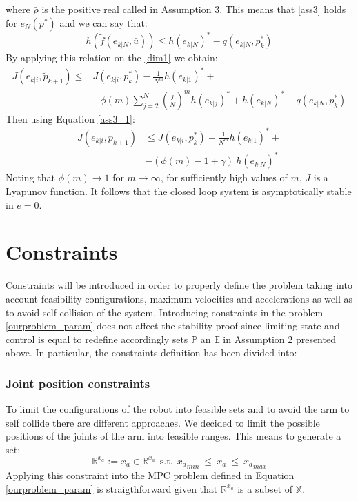 where $\bar{\rho}$ is the positive real called in Assumption 3.
This means that \ref{ass3} holds for $e_N(p^*)$ and we can say that:
\begin{equation*}
    h(\tilde{f}(e_{k|N},\bar{u})) \le h(e_{k|N})^*-q(e_{k|N},p_k^*)
\end{equation*}
By applying this relation on the \ref{dim1} we obtain: 
\begin{equation*}
    \begin{split}
        J({e}_{k|i},\tilde{p}_{k+1})\le &J({e}_{k|i},p_{k}^*) - \frac{1}{N^m}h(e_{k|1})^*+ \\ 
        &-\phi(m)\sum_{j=2}^{N}\left(\frac{j}{N}\right)^m h(e_{k|j})^*+ h(e_{k|N})^*-q(e_{k|N},p_k^*)
    \end{split}
\end{equation*}
Then using Equation \ref{ass3_1}:
\begin{equation*}
    \begin{split}
        J({e}_{k|i},\tilde{p}_{k+1})&\le J({e}_{k|i},p_{k}^*) - \frac{1}{N^m}h(e_{k|1})^*+ \\ 
            &-(\phi(m)-1+\gamma)\ h(e_{k|N})^*
    \end{split}
\end{equation*}
Noting that $\phi(m) \rightarrow 1$ for $m \rightarrow \infty$, for sufficiently high values of $m$, $J$ is a Lyapunov function. It follows that the closed loop system is asymptotically stable in $e=0$.

\section{Constraints}

Constraints will be introduced in order to properly define the problem taking into account feasibility configurations, maximum velocities and accelerations as well as to avoid self-collision of the system. Introducing constraints in the problem \ref{ourproblem_param} does not affect the stability proof since limiting state and control is equal to redefine accordingly sets $\mathbb{P}$ an $\mathbb{E}$ in Assumption 2 presented above.
In particular, the constraints definition has been divided into: 

\subsubsection*{Joint position constraints}
	To limit the configurations of the robot into feasible sets and to avoid the arm to self collide there are different approaches. We decided to limit the possible positions of the joints of the arm into feasible ranges. This means to generate a set:
	\begin{equation}
		\mathbb{R}^{x_a}:=x_a \in \mathbb{R}^{x_a}\ \ \text{s.t.}\ \  {x_a}_{min}\ \leq\ x_a\ \leq\ {x_a}_{max} 
	\end{equation}
	Applying this constraint into the MPC problem defined in Equation \ref{ourproblem_param} is straigthforward given that $\mathbb{R}^{x_a}$ is a subset of $\mathbb{X}$.
